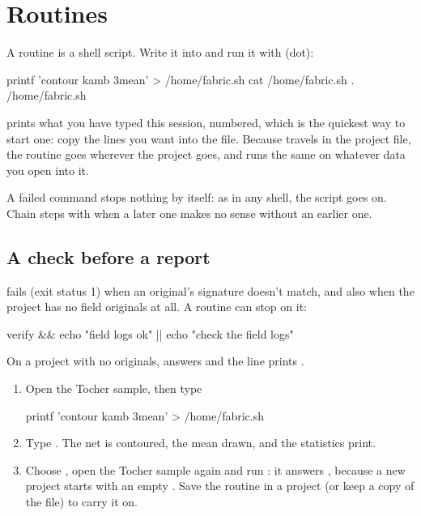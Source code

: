 \section{Routines}\label{sec:routines}


A routine is a shell script. Write it into  and run it with  (dot):

\begin{codeblock}
printf 'contour kamb 3\nshow mean\nstats\n' > /home/fabric.sh
cat /home/fabric.sh
. /home/fabric.sh
\end{codeblock}

 prints what you have typed this session, numbered, which is the quickest way to start one:
copy the lines you want into the file. Because  travels in the project file, the routine goes
wherever the project goes, and runs the same on whatever data you open into it.

\begin{note}
A failed command stops nothing by itself: as in any shell, the script goes on. Chain steps with
\code{\&\&} when a later one makes no sense without an earlier one.
\end{note}

\subsection{A check before a report}

 fails (exit status 1) when an original's signature doesn't match, and also when the
project has no field originals at all. A routine can stop on it:

\begin{codeblock}
verify && echo "field logs ok" || echo "check the field logs"
\end{codeblock}

On a project with no originals,  answers  and the line prints .

\begin{tryit}
\begin{enumerate}
\item Open the Tocher sample, then type
\begin{codeblock}
printf 'contour kamb 3\nshow mean\nstats\n' > /home/fabric.sh
\end{codeblock}
\item Type . The net is contoured, the mean drawn, and the statistics print.
\item Choose , open the Tocher sample again and run : it
answers , because a new
project starts with an empty . Save the routine in a project (or keep a copy of the file)
to carry it on.
\end{enumerate}
\end{tryit}
